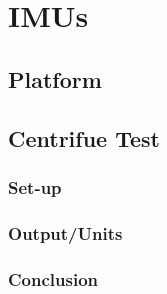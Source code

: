 \chapter{IMUs}\label{cha2}
\section{Platform}
\section{Centrifue Test}
\subsection{Set-up}
\subsection{Output/Units}
\subsection{Conclusion}

